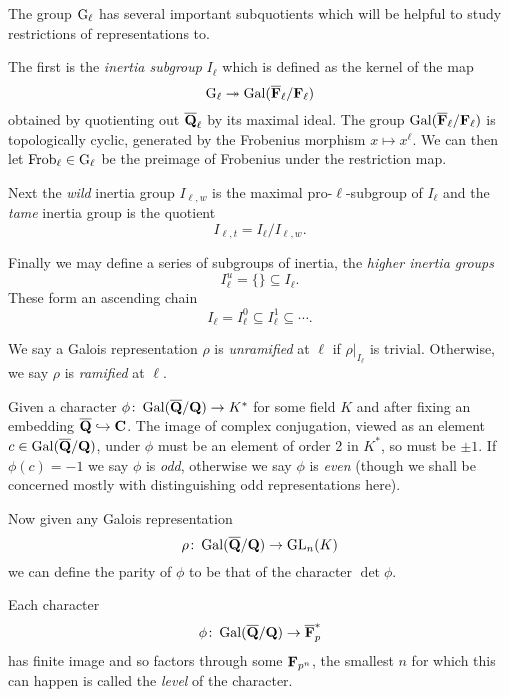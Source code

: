 \documentclass[a4paper,12pt]{article}
\begin{document}
The group $\mathrm{G}_\ell$ has several important subquotients which will be helpful to study restrictions of representations to.
\begin{defn}\label{defn-inert}
The first is the \emph{inertia subgroup} $I_\ell$ which is defined as the kernel of the map
\[
\mathrm{G}_\ell \twoheadrightarrow \operatorname{Gal}(\overline{\mathbf{F}}_\ell/\mathbf{F}_\ell)
\]
obtained by quotienting out $\overline{\mathbf{Q}}_\ell$ by its maximal ideal.
The group $\operatorname{Gal}(\overline{\mathbf{F}}_\ell/\mathbf{F}_\ell)$ is topologically cyclic, generated by the Frobenius morphism $x \mapsto x^\ell$.
We can then let $\operatorname{Frob}_\ell\in \mathrm{G}_\ell$ be the preimage of Frobenius under the restriction map.


Next the \emph{wild} inertia group $I_{\ell,w}$ is the maximal pro-$\ell$-subgroup of $I_\ell$ and the \emph{tame} inertia group is the quotient
\[
I_{\ell,t} = I_\ell / I_{\ell,w}.
\]

Finally we may define a series of subgroups of inertia, the \emph{higher inertia groups}
\[
I_\ell^u = \{\}\subseteq I_\ell.
\]
These form an ascending chain
\[
I_\ell = I_\ell^0 \subseteq I_\ell^1 \subseteq \cdots.
\]
\end{defn}

\begin{defn}
We say a Galois representation $\rho$ is \emph{unramified} at $\ell$ if $\rho|_{I_\ell}$ is trivial.
Otherwise, we say $\rho$ is \emph{ramified} at $\ell$.
\end{defn}

\begin{defn}
Given a character $\phi\colon\operatorname{Gal}(\overline{\mathbf{Q}}/\mathbf{Q}) \to K^*$ for some field $K$ and after fixing an embedding $\overline{\mathbf{Q}}\hookrightarrow \mathbf{C}$.
The image of complex conjugation, viewed as an element $c\in \operatorname{Gal}(\overline{\mathbf{Q}}/\mathbf{Q})$, under $\phi$ must be an element of order 2 in $K^*$, so must be $\pm 1$.
If $\phi(c) = -1$ we say $\phi$ is \emph{odd}, otherwise we say $\phi$  is \emph{even} (though we shall be concerned mostly with distinguishing odd representations here).

Now given any Galois representation
\[
\rho\colon\operatorname{Gal}(\overline{\mathbf{Q}}/\mathbf{Q}) \to \operatorname{GL}_n(K)
\]
we can define the parity of $\phi$ to be that of the character $\det\phi$.
\end{defn}



\begin{defn}
Each character
\[
\phi \colon \operatorname{Gal}(\overline{\mathbf{Q}}/\mathbf{Q}) \to \overline{\mathbf{F}}_p^*
\]
has finite image and so factors through some $\mathbf{F}_{p^n}$, the smallest $n$ for which this can happen is called the \emph{level} of the character.
\end{defn}
\end{document}
